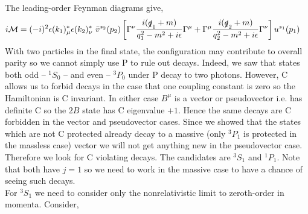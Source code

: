 \documentclass[12pt]{article}
\newcommand{\cM}{\mathcal{M}}
\begin{document}
The leading-order Feynman diagrams give,
\begin{align*}
i \cM = (-i)^2 & \epsilon(k_1)^*_{\mu} \epsilon(k_2)^*_{\nu} \, \, \bar{v}^{s_2}(p_2) \left[ \Gamma^{\nu} \frac{i(\slashed{q}_1 + m)}{q_1^2 - m^2 + i \epsilon} \Gamma^\mu + \Gamma^{\mu} \frac{i(\slashed{q}_2 + m)}{q_2^2 - m^2 + i \epsilon} \Gamma^{\nu} \right] u^{s_1}(p_1)
\end{align*}
With two particles in the final state, the configuration may contribute to overall parity so we cannot simply use P to rule out decays. Indeed, we saw that states both odd -- ${}^1 S_0$ -- and even -- ${}^3 P_0$ under P decay to two photons. However, C allows us to forbid decays in the case that one coupling constant is zero so the Hamiltonian is C invariant. In either case $B^\mu$ is a vector or pseudovector i.e. has definite C so the $2 B$ state has C eigenvalue $+1$. Hence the same decays are C forbidden in the vector and pseudovector cases. Since we showed that the states which are not C protected already decay to a massive (only ${}^3 P_1$ is protected in the massless case) vector we will not get anything new in the pseudovector case. Therefore we look for C violating decays. The candidates are ${}^3 S_1$ and ${}^1 P_1$. Note that both have $j = 1$ so we need to work in the massive case to have a chance of seeing such decays.
\bigskip\\
For ${}^3 S_1$ we need to consider only the nonrelativistic limit to zeroth-order in momenta. Consider,
\end{document}
